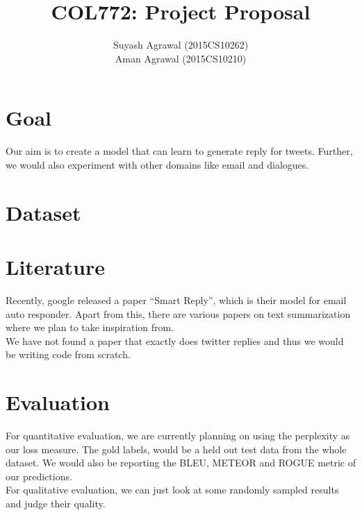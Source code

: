 \documentclass[10pt,a4paper]{article}
\title{COL772: Project Proposal}
\author{Suyash Agrawal (2015CS10262) \\ Aman Agrawal (2015CS10210)}
\begin{document}
\maketitle
\section{Goal}
    Our aim is to create a model that can learn to generate reply for tweets. Further, we would also experiment
    with other domains like email and dialogues.
\section{Dataset}
\section{Literature}
    Recently, google released a paper ``Smart Reply''\cite{paper:smartReply}, which is their model for 
    email auto responder. Apart from this, there are various papers on text summarization\cite{paper:pointer}
    where we plan to take inspiration from.\\
    We have not found a paper that exactly does twitter replies and thus we would be writing code from scratch.
\section{Evaluation}
    For quantitative evaluation, we are currently planning on using the perplexity as our loss measure. The gold
    labels, would be a held out test data from the whole dataset. We would also be reporting the BLEU, METEOR and
    ROGUE metric of our predictions.\\
    For qualitative evaluation, we can just look at some randomly sampled results and judge their quality.

    
    
\end{document}
